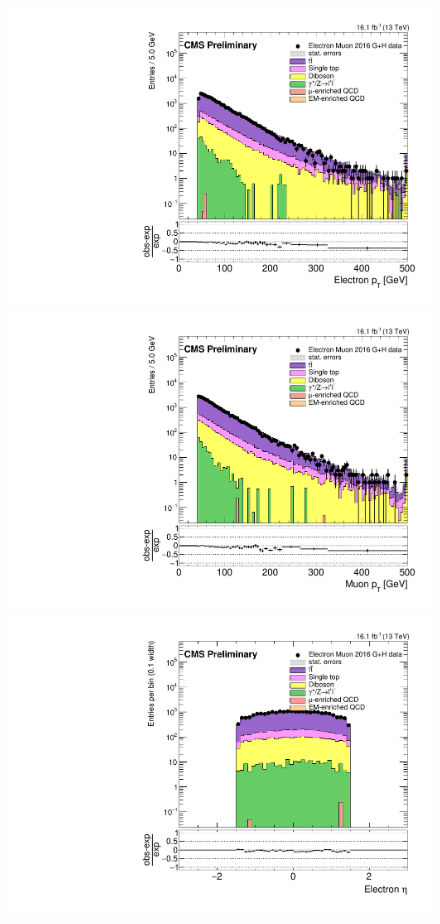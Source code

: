 \begin{figure}[hbtp]
\centering
\includegraphics[scale=0.3]{figures/selection/pcr_emu_2016/electronPt.pdf}
\includegraphics[scale=0.3]{figures/selection/pcr_emu_2016/muonPt.pdf}
\includegraphics[scale=0.3]{figures/selection/pcr_emu_2016/electronEta.pdf}

\end{figure}
